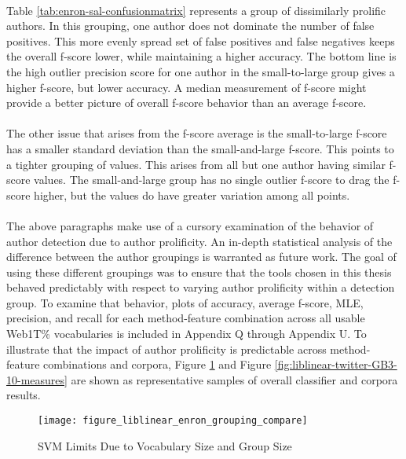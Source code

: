 	\paragraph*{} Table \ref{tab:enron-sal-confusionmatrix} represents a group of dissimilarly prolific authors.  In this grouping, one author does not dominate the number of false positives.  This more evenly spread set of false positives and false negatives keeps the overall f-score lower, while maintaining a higher accuracy.  The bottom line is the high outlier precision score for one author in the small-to-large group gives a higher f-score, but lower accuracy.  A median measurement of f-score might provide a better picture of overall f-score behavior than an average f-score.
	\paragraph*{} The other issue that arises from the f-score average is the small-to-large f-score has a smaller standard deviation than the small-and-large f-score.  This points to a tighter grouping of values.  This arises from all but one author having similar f-score values.  The small-and-large group has no single outlier f-score to drag the f-score higher, but the values do have greater variation among all points.
	\paragraph*{}The above paragraphs make use of a cursory examination of the behavior of author detection due to author prolificity.  An in-depth statistical analysis of the difference between the author groupings is warranted as future work.  The goal of using these different groupings was to ensure that the tools chosen in this thesis behaved predictably with respect to varying author prolificity within a detection group.  To examine that behavior, plots of accuracy, average f-score, MLE, precision, and recall for each method-feature combination across all usable Web1T\% vocabularies is included in Appendix Q through Appendix U.  To illustrate that the impact of author prolificity is predictable across method-feature combinations and corpora, Figure \ref{fig:liblinear-enron-GB3-10-measures} and Figure \ref{fig:liblinear-twitter-GB3-10-measures} are shown as representative samples of overall classifier and corpora results.
	
\begin{figure}[htbp!]
	\begin{center}
	\centering
	\texttt{[image: figure\_liblinear\_enron\_grouping\_compare]}
	\caption{SVM Limits Due to Vocabulary Size and Group Size}
	\label{fig:liblinear-enron-GB3-10-measures}
	\end{center}
\end{figure}

